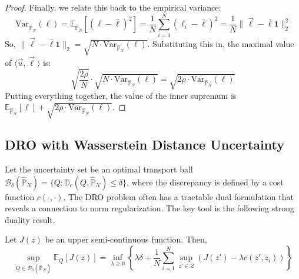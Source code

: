 \documentclass[12pt]{report}
\begin{document}
\begin{proof}
Finally, we relate this back to the empirical variance:
\[
\text{Var}_{\hat{\mathbb{P}}_N}(\ell) = \mathbb{E}_{\hat{\mathbb{P}}_N}[(\ell - \bar{\ell})^2] = \frac{1}{N}\sum_{i=1}^N(\ell_i - \bar{\ell})^2 = \frac{1}{N}\|\vec{\ell} - \bar{\ell}\mathbf{1}\|_2^2
\]
So, $\|\vec{\ell} - \bar{\ell}\mathbf{1}\|_2 = \sqrt{N \cdot \text{Var}_{\hat{\mathbb{P}}_N}(\ell)}$.
Substituting this in, the maximal value of $\langle \vec{u}, \vec{\ell} \rangle$ is:
\[
\sqrt{\frac{2\rho}{N}} \cdot \sqrt{N \cdot \text{Var}_{\hat{\mathbb{P}}_N}(\ell)} = \sqrt{2\rho \cdot \text{Var}_{\hat{\mathbb{P}}_N}(\ell)}
\]
Putting everything together, the value of the inner supremum is $\mathbb{E}_{\hat{\mathbb{P}}_N}[\ell] + \sqrt{2\rho \cdot \text{Var}_{\hat{\mathbb{P}}_N}(\ell)}$.
\end{proof}

\subsection{DRO with Wasserstein Distance Uncertainty}

\begin{theorem}

Let the uncertainty set be an optimal transport ball $\mathcal{B}_\delta(\hat{\mathbb{P}}_N) = \{ Q : \mathbb{D}_c(Q, \hat{\mathbb{P}}_N) \le \delta \}$, where the discrepancy is defined by a cost function $c(\cdot, \cdot)$. The DRO problem often has a tractable dual formulation that reveals a connection to norm regularization. The key tool is the following strong duality result.
\end{theorem}

\begin{lemma}
Let $J(z)$ be an upper semi-continuous function. Then,
\[
\sup_{Q \in \mathcal{B}_\delta(\hat{\mathbb{P}}_N)} \mathbb{E}_Q[J(z)] = \inf_{\lambda \ge 0} \left\{ \lambda\delta + \frac{1}{N}\sum_{i=1}^N \sup_{z' \in Z} \left( J(z') - \lambda c(z', z_i) \right) \right\}
\]
\end{lemma}
\end{document}
